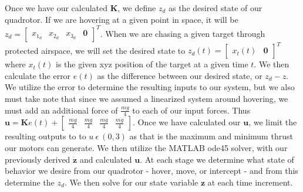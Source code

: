 \documentclass{article}
\begin{document}
\begin{multicols}{2}
Once we have our calculated $\boldsymbol{K}$, we define $z_d$ as the desired state of our quadrotor. If we are hovering  
at a given point in space, it will be $z_d=\begin{bmatrix} x_{1_d} & x_{2_d} & x_{3_d} & \boldsymbol{0} 
\end{bmatrix}^T$. When we are chasing a given target through protected airspace, we will set the desired state to 
$z_d(t)=\begin{bmatrix} x_t(t) & \boldsymbol{0} \end{bmatrix}^T$ where $x_t(t)$ is the given xyz position of the target at a given 
time $t$. We then calculate the error $e(t)$ as the difference between our desired state, or $z_d - z$. We utilize the error to 
determine the resulting inputs to our system, but we also must take note that since we assumed a linearized system around 
hovering, we must add an additional force of $\frac{mg}{4}$ to each of our input forces. Thus $\boldsymbol{u}= \boldsymbol{K}e(t) + 
\begin{bmatrix}\frac{mg}{4} & \frac{mg}{4} & \frac{mg}{4} & \frac{mg}{4}\end{bmatrix}$. 
Once we have calculated our $\boldsymbol{u}$, we limit the resulting outputs to to $u\  \epsilon\  (0, 3)$ as that is the maximum and minimum thrust our motors can generate. We then utilize the MATLAB ode45 solver, with our previously derived $\boldsymbol{\dot{z}}$ and calculated $\boldsymbol{u}$. At each stage we determine what state of behavior we desire from our quadrotor - hover, move, or intercept - and from this determine the $z_d$. We then solve for our state variable $\boldsymbol{z}$ at each time increment.


\end{multicols}
\end{document}
